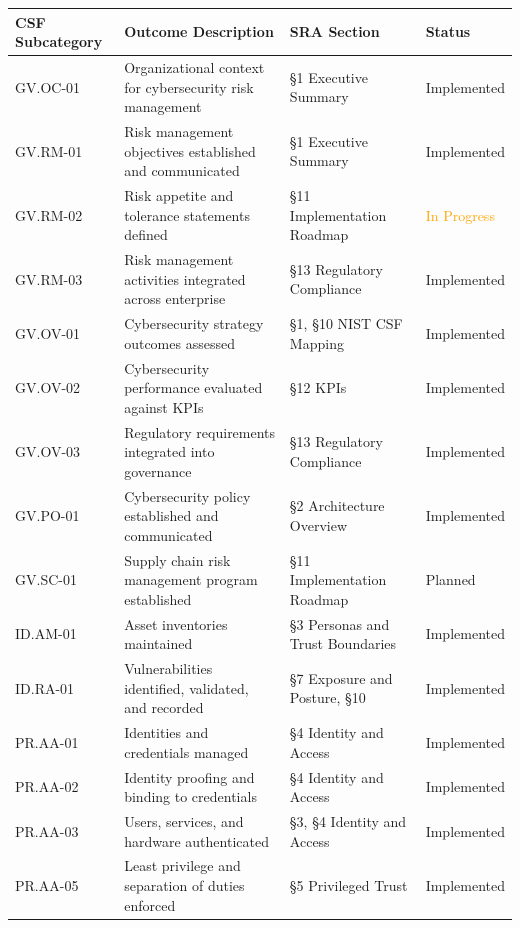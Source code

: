 \documentclass[11pt,landscape]{article}
\begin{document}
\begin{longtable}{lp{3in}p{2in}l}
\toprule
\textbf{CSF Subcategory} & \textbf{Outcome Description} & \textbf{SRA Section} & \textbf{Status} \\
\midrule
\endhead
GV.OC-01 & Organizational context for cybersecurity risk management & §1 Executive Summary & \textcolor{stridegreen}{Implemented} \\
GV.RM-01 & Risk management objectives established and communicated & §1 Executive Summary & \textcolor{stridegreen}{Implemented} \\
GV.RM-02 & Risk appetite and tolerance statements defined & §11 Implementation Roadmap & \textcolor{orange}{In Progress} \\
GV.RM-03 & Risk management activities integrated across enterprise & §13 Regulatory Compliance & \textcolor{stridegreen}{Implemented} \\
GV.OV-01 & Cybersecurity strategy outcomes assessed & §1, §10 NIST CSF Mapping & \textcolor{stridegreen}{Implemented} \\
GV.OV-02 & Cybersecurity performance evaluated against KPIs & §12 KPIs & \textcolor{stridegreen}{Implemented} \\
GV.OV-03 & Regulatory requirements integrated into governance & §13 Regulatory Compliance & \textcolor{stridegreen}{Implemented} \\
GV.PO-01 & Cybersecurity policy established and communicated & §2 Architecture Overview & \textcolor{stridegreen}{Implemented} \\
GV.SC-01 & Supply chain risk management program established & §11 Implementation Roadmap & \textcolor{gapred}{Planned} \\
ID.AM-01 & Asset inventories maintained & §3 Personas and Trust Boundaries & \textcolor{stridegreen}{Implemented} \\
ID.RA-01 & Vulnerabilities identified, validated, and recorded & §7 Exposure and Posture, §10 & \textcolor{stridegreen}{Implemented} \\
PR.AA-01 & Identities and credentials managed & §4 Identity and Access & \textcolor{stridegreen}{Implemented} \\
PR.AA-02 & Identity proofing and binding to credentials & §4 Identity and Access & \textcolor{stridegreen}{Implemented} \\
PR.AA-03 & Users, services, and hardware authenticated & §3, §4 Identity and Access & \textcolor{stridegreen}{Implemented} \\
PR.AA-05 & Least privilege and separation of duties enforced & §5 Privileged Trust & \textcolor{stridegreen}{Implemented} \\

\end{longtable}
\end{document}
